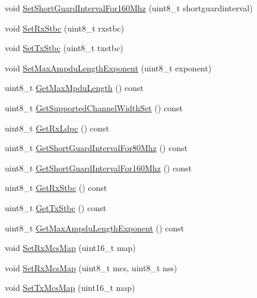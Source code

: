 \begin{DoxyCompactItemize}
\item 
void \hyperlink{classns3_1_1VhtCapabilities_ab91b61a7023c4718ecc9b3c7a5088629}{Set\+Short\+Guard\+Interval\+For160\+Mhz} (uint8\+\_\+t shortguardinterval)
\item 
void \hyperlink{classns3_1_1VhtCapabilities_ad565061af06045dfd5c190552ae4bfff}{Set\+Rx\+Stbc} (uint8\+\_\+t rxstbc)
\item 
void \hyperlink{classns3_1_1VhtCapabilities_a976fa180851f87d8f8fbe123bd564b81}{Set\+Tx\+Stbc} (uint8\+\_\+t txstbc)
\item 
void \hyperlink{classns3_1_1VhtCapabilities_ab5978942eb3024e504ddab54f705987e}{Set\+Max\+Ampdu\+Length\+Exponent} (uint8\+\_\+t exponent)
\item 
uint8\+\_\+t \hyperlink{classns3_1_1VhtCapabilities_afc9a17faa996081a3e9d4aa675807375}{Get\+Max\+Mpdu\+Length} () const 
\item 
uint8\+\_\+t \hyperlink{classns3_1_1VhtCapabilities_a1b67c5ee09c2b1a4557e3a19008be65a}{Get\+Supported\+Channel\+Width\+Set} () const 
\item 
uint8\+\_\+t \hyperlink{classns3_1_1VhtCapabilities_a94fa8df7ba6ad0114876ae13733e6dca}{Get\+Rx\+Ldpc} () const 
\item 
uint8\+\_\+t \hyperlink{classns3_1_1VhtCapabilities_a8adc5f269d20d2ccb179ebc343908198}{Get\+Short\+Guard\+Interval\+For80\+Mhz} () const 
\item 
uint8\+\_\+t \hyperlink{classns3_1_1VhtCapabilities_a54a3a8e6f6e686125e7ad049ee75a416}{Get\+Short\+Guard\+Interval\+For160\+Mhz} () const 
\item 
uint8\+\_\+t \hyperlink{classns3_1_1VhtCapabilities_a6de7519fe1ab642a280360ad63337864}{Get\+Rx\+Stbc} () const 
\item 
uint8\+\_\+t \hyperlink{classns3_1_1VhtCapabilities_a5be974d0168dc8572102b92ca7285047}{Get\+Tx\+Stbc} () const 
\item 
uint8\+\_\+t \hyperlink{classns3_1_1VhtCapabilities_afba1cb67ad68977d45eaf2b9cb6fa42e}{Get\+Max\+Ampdu\+Length\+Exponent} () const 
\item 
void \hyperlink{classns3_1_1VhtCapabilities_a42c9a53a068168326cc76d75d8a96d37}{Set\+Rx\+Mcs\+Map} (uint16\+\_\+t map)
\item 
void \hyperlink{classns3_1_1VhtCapabilities_aecde23bf93a3368f60801701c46dea0b}{Set\+Rx\+Mcs\+Map} (uint8\+\_\+t mcs, uint8\+\_\+t nss)
\item 
void \hyperlink{classns3_1_1VhtCapabilities_a54ea74eb05fb2cf97a75ac6a488d4b57}{Set\+Tx\+Mcs\+Map} (uint16\+\_\+t map)

\end{DoxyCompactItemize}
